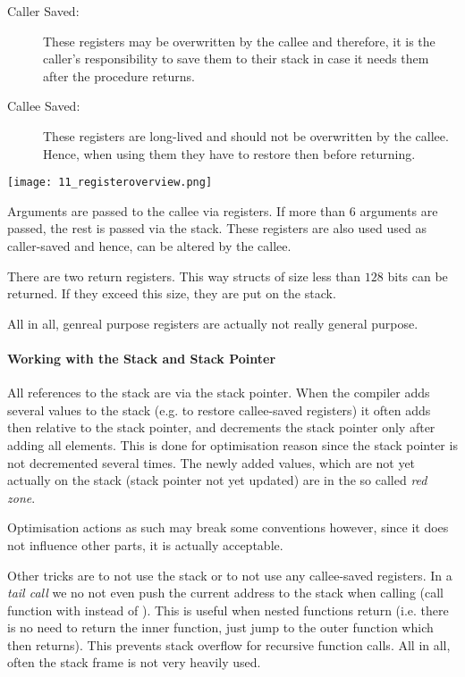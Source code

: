 \begin{description}
    \item[Caller Saved:] These registers may be overwritten by the callee and therefore, it is the caller's responsibility to save them to their stack in case it needs them after the procedure returns.
    \item[Callee Saved:] These registers are long-lived and should not be overwritten by the callee. Hence, when using them they have to restore then before returning.
\end{description}

\texttt{[image: 11\_registeroverview.png]}

Arguments are passed to the callee via registers. If more than $6$ arguments are passed, the rest is passed via the stack. These registers are also used used as caller-saved and hence, can be altered by the callee.

There are two return registers. This way structs of size less than $128$ bits can be returned. If they exceed this size, they are put on the stack.

All in all, genreal purpose registers are actually not really general purpose.

\paragraph{Working with the Stack and Stack Pointer}
All references to the stack are via the stack pointer. When the compiler adds several values to the stack (e.g. to restore callee-saved registers) it often adds then relative to the stack pointer, and decrements the stack pointer only after adding all elements. This is done for optimisation reason since the stack pointer is not decremented several times. The newly added values, which are not yet actually on the stack (stack pointer not yet updated) are in the so called \textit{red zone}.

Optimisation actions as such may break some conventions however, since it does not influence other parts, it is actually acceptable.

Other tricks are to not use the stack or to not use any callee-saved registers. In a \textit{tail call} we no not even push the current address to the stack when calling (call function with  instead of ). This is useful when nested functions return (i.e. there is no need to return the inner function, just jump to the outer function which then returns). This prevents stack overflow for recursive function calls. All in all, often the stack frame is not very heavily used.
